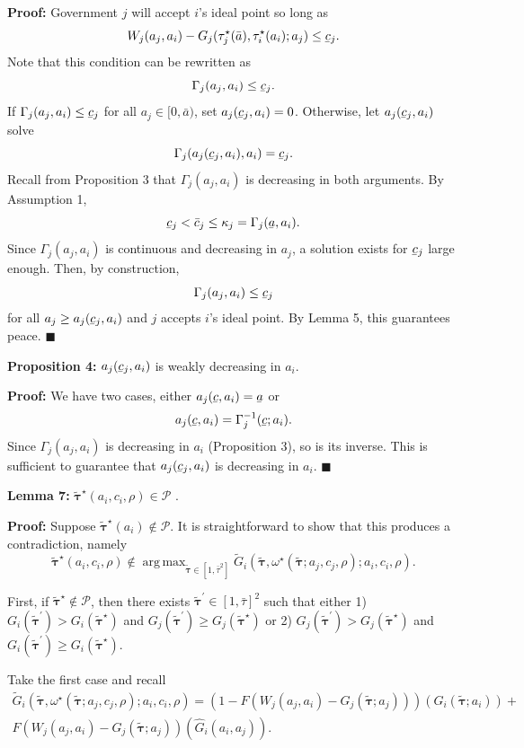 \documentclass{puthesis}
\DeclareMathOperator*{\argmax}{arg\,max}
\DeclareRobustCommand{\ubar}[1]{\underaccent{\bar}{#1}}
\begin{document}
\textbf{Proof:} Government \(j\) will accept \(i\)'s ideal point so long
as \[
W_j(a_j, a_i) - G_j(\tau_j^\star(\bar{a}), \tau_i^\star(a_i); a_j) \leq \ubar{c}_j .
\] Note that this condition can be rewritten as \[
\Gamma_j(a_j, a_i) \leq \ubar{c}_j .
\] If \(\Gamma_j(a_j, a_i) \leq \ubar{c}_j\) for all
\(a_j \in [0, \bar{a})\), set \(a_j(\ubar{c}_j, a_i) = 0\). Otherwise,
let \(a_j(\ubar{c}_j, a_i)\) solve \[
\Gamma_j(a_j(\ubar{c}_j, a_i), a_i) = \ubar{c}_j .
\] Recall from Proposition 3 that \(\Gamma_j(a_j, a_i)\) is decreasing
in both arguments. By Assumption 1, \[
\ubar{c}_j < \bar{c}_j \leq \kappa_j = \Gamma_j(\ubar{a}, a_i) .
\] Since \(\Gamma_j(a_j, a_i)\) is continuous and decreasing in \(a_j\),
a solution exists for \(\ubar{c}_j\) large enough. Then, by
construction, \[
\Gamma_j(a_j, a_i) \leq \ubar{c}_j
\] for all \(a_j \geq a_j(\ubar{c}_j, a_i)\) and \(j\) accepts \(i\)'s
ideal point. By Lemma 5, this guarantees peace. \(\blacksquare\)

\textbf{Proposition 4:} \(a_j(\ubar{c}_j, a_i)\) is weakly decreasing in
\(a_i\).

\textbf{Proof:} We have two cases, either
\(a_j(\ubar{c}, a_i) = \ubar{a}\) or \[
a_j(\ubar{c}, a_i) = \Gamma_j^{-1}(\ubar{c}; a_i) .
\] Since \(\Gamma_j(a_j, a_i)\) is decreasing in \(a_i\) (Proposition
3), so is its inverse. This is sufficient to guarantee that
\(a_j(\ubar{c}_j, a_i)\) is decreasing in \(a_i\). \(\blacksquare\)

\textbf{Lemma 7:}
\(\tilde{\bm{\tau}}^\star(a_i, c_i, \rho) \in \mathcal{P}\) .

\textbf{Proof:} Suppose
\(\tilde{\bm{\tau}}^\star(a_i) \notin \mathcal{P}\). It is
straightforward to show that this produces a contradiction, namely \[
\tilde{\bm{\tau}}^\star(a_i, c_i, \rho) \notin \argmax_{\tilde{\bm{\tau}} \in [1, \bar{\tau}^2]} \tilde{G}_i \left( \tilde{\bm{\tau}}, \omega^\star(\tilde{\bm{\tau}}; a_j, c_j, \rho); a_i, c_i, \rho \right) .
\]

First, if \(\tilde{\bm{\tau}}^\star \notin \mathcal{P}\), then there
exists \(\tilde{\bm{\tau}}^\prime \in [1, \bar{\tau}]^2\) such that
either 1)
\(G_i(\tilde{\bm{\tau}}^\prime) > G_i(\tilde{\bm{\tau}}^\star)\) and
\(G_j(\tilde{\bm{\tau}}^\prime) \geq G_j(\tilde{\bm{\tau}}^\star)\) or
2) \(G_j(\tilde{\bm{\tau}}^\prime) > G_j(\tilde{\bm{\tau}}^\star)\) and
\(G_i(\tilde{\bm{\tau}}^\prime) \geq G_i(\tilde{\bm{\tau}}^\star)\).

Take the first case and recall \begin{equation*}
\begin{split}
\tilde{G}_i \left( \tilde{\bm{\tau}}, \omega^\star(\tilde{\bm{\tau}}; a_j, c_j, \rho); a_i, c_i, \rho \right) = \left( 1 - F \left( W_j(a_j, a_i) - G_j( \tilde{\bm{\tau}}; a_j ) \right) \right) \left( G_i( \tilde{\bm{\tau}}; a_i ) \right) + \\
F \left( W_j(a_j, a_i) - G_j(\tilde{\bm{\tau}}; a_j) \right) \left( \hat{G}_i(a_i, a_j) \right) .
\end{split}
\end{equation*}
\end{document}
